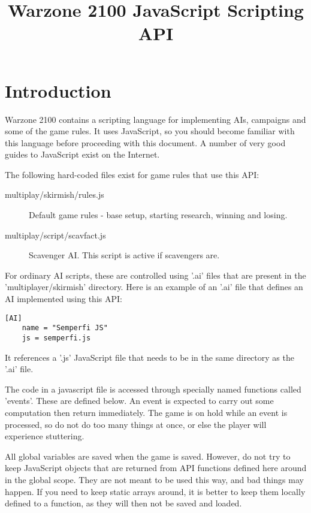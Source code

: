 \documentclass[12pt]{article}
\title{Warzone 2100 JavaScript Scripting API}
\author{}
\begin{document}
\maketitle

\section{Introduction}

Warzone 2100 contains a scripting language for implementing AIs, campaigns and some of the game
rules. It uses JavaScript, so you should become familiar with this language before proceeding
with this document. A number of very good guides to JavaScript exist on the Internet.

The following hard-coded files exist for game rules that use this API:

\begin{description}
	\item[multiplay/skirmish/rules.js] Default game rules - base setup, starting research, winning and losing.
	\item[multiplay/script/scavfact.js] Scavenger AI. This script is active if scavengers are.
\end{description}

For ordinary AI scripts, these are controlled using '.ai' files that are present in the 'multiplayer/skirmish'
directory. Here is an example of an '.ai' file that defines an AI implemented using this API:

\begin{lstlisting}[]
	[AI]
	name = "Semperfi JS"
	js = semperfi.js
\end{lstlisting}

It references a '.js' JavaScript file that needs to be in the same directory as the '.ai' file. 

The code in a javascript file is accessed through specially named functions called 'events'. These are defined below. 
An event is expected to carry out some computation then return immediately. The game is on hold while an event is 
processed, so do not do too many things at once, or else the player will experience stuttering.

All global variables are saved when the game is saved. However, do not try to keep JavaScript objects that are
returned from API functions defined here around in the global scope. They are not meant to be used this way, and
bad things may happen. If you need to keep static arrays around, it is better to keep them locally defined to a
function, as they will then not be saved and loaded.
\end{document}
